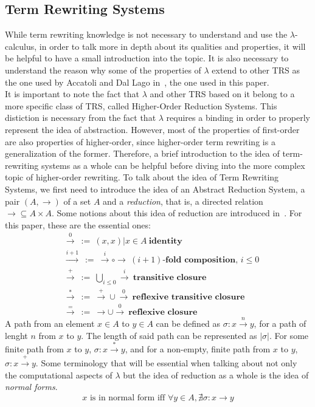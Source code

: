 \documentclass[12pt]{article}
\begin{document}
\subsection{Term Rewriting Systems}\label{intro-trs}
While term rewriting knowledge is not necessary to understand and use the $\lambda$-calculus, in order to talk more in depth about its qualities and properties, it will be helpful to have a small introduction into the topic. It is also necessary to understand the reason why some of the properties of $\lambda$ extend to other TRS as the one used by Accatoli and Dal Lago in~\cite{beta-invariance}, the one used in this paper.\\
It is important to note the fact that $\lambda$ and other TRS based on it belong to a more specific class of TRS, called Higher-Order Reduction Systems. This distiction is necessary from the fact that $\lambda$ requires a binding in order to properly represent the idea of abstraction. However, most of the properties of first-order are also properties of higher-order, since higher-order term rewriting is a generalization of the former. Therefore, a brief introduction to the idea of term-rewriting systems as a whole can be helpful before diving into the more complex topic of higher-order rewriting.
To talk about the idea of Term Rewriting Systems, we first need to introduce the idea of an Abstract Reduction System, a pair $(A, \rightarrow)$ of a set $A$ and a \textit{reduction}, that is, a directed relation $\rightarrow \subseteq A \times A$. Some notions about this idea of reduction are introduced in~\cite{term-rewriting-and-all-that}. For this paper, these are the essential ones:
\begin{equation}
  \begin{split}
    &\xrightarrow{0} \ := \ {(x,x) | x \in A} \ \textbf{identity} \\
    &\xrightarrow{i + 1} \ := \ \xrightarrow{i} \circ \rightarrow \ (i+1)\textbf{-fold composition, } i \leq 0 \\
    &\xrightarrow{+} \ := \ \bigcup_{i \leq 0} \xrightarrow{i} \ \textbf{transitive closure} \\
    &\xrightarrow{*} \ := \ \xrightarrow{+} \cup \xrightarrow{0} \ \textbf{reflexive transitive closure} \\
    &\xrightarrow{=} \ := \ \rightarrow \cup \xrightarrow{0} \ \textbf{reflexive closure}
  \end{split}
\end{equation}
A path from an element $x \in A$ to $y \in A$ can be defined as $\sigma : x \xrightarrow{n} y$, for a path of lenght $n$ from $x$ to $y$. The length of said path can be represented as $| \sigma |$. For some finite path from $x$ to $y$, $\sigma : x \xrightarrow{*} y$, and for a non-empty, finite path from $x$ to $y$, $\sigma : x \xrightarrow{+} y$.
Some terminology that will be essential when talking about not only the computational aspects of $\lambda$ but the idea of reduction as a whole is the idea of \textit{normal forms}.
\begin{equation}
  x \text{ is in normal form iff } \forall y \in A , \nexists \sigma : x \rightarrow y
\end{equation}
\end{document}
